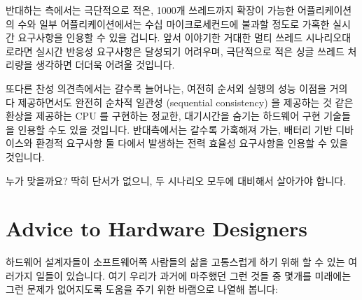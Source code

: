 반대하는 측에서는 극단적으로 적은, 1000개 쓰레드까지 확장이 가능한
어플리케이션의 수와 일부 어플리케이션에서는 수십 마이크로세컨드에 불과할 정도로
가혹한 실시간 요구사항을 인용할 수 있을 겁니다.
앞서 이야기한 거대한 멀티 쓰레드 시나리오대로라면 실시간 반응성 요구사항은
달성되기 어려우며, 극단적으로 적은 싱글 쓰레드 처리량을 생각하면 더더욱 어려울
것입니다.

또다른 찬성 의견측에서는 갈수록 늘어나는, 여전히 순서외 실행의 성능 이점을 거의
다 제공하면서도 완전히 순차적 일관성 (sequential consistency) 을 제공하는 것
같은 환상을 제공하는 CPU 를 구현하는 정교한, 대기시간을 숨기는 하드웨어 구현
기술들을 인용할 수도 있을 것입니다.
반대측에서는 갈수록 가혹해져 가는, 배터리 기반 디바이스와 환경적 요구사항 둘
다에서 발생하는 전력 효율성 요구사항을 인용할 수 있을 것입니다.

누가 맞을까요?
딱히 단서가 없으니, 두 시나리오 모두에 대비해서 살아가야 합니다.

\section{Advice to Hardware Designers}
\label{sec:app:whymb:Advice to Hardware Designers}

하드웨어 설계자들이 소프트웨어쪽 사람들의 삶을 고통스럽게 하기 위해 할 수 있는
여러가지 일들이 있습니다.
여기 우리가 과거에 마주했던 그런 것들 중 몇개를 미래에는 그런 문제가 없어지도록
도움을 주기 위한 바램으로 나열해 봅니다:
\iffalse

